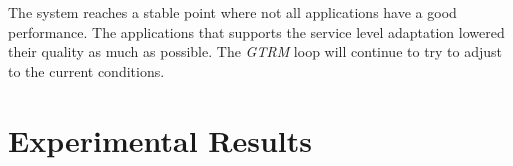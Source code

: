 \documentclass[nobiblatex]{LTHthesis}
\begin{document}
The system reaches a stable point where not all applications have a good
performance. The applications that supports the service level adaptation 
lowered their quality as much as possible. The \emph{GTRM} loop will continue to
try to adjust to the current conditions.

\chapter{Experimental Results}
\label{chp:test}

\end{document}
